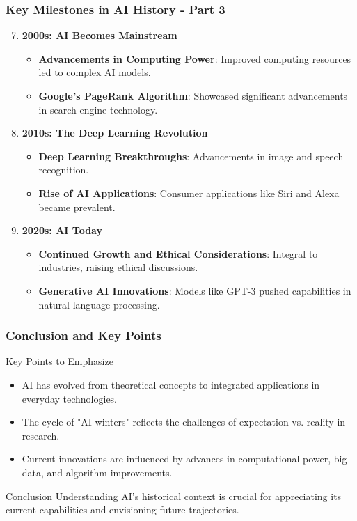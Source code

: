 \documentclass[aspectratio=169]{beamer}
\begin{document}
\begin{frame}[fragile]
    \frametitle{Key Milestones in AI History - Part 3}
    \begin{enumerate}
        \setcounter{enumi}{6} %
        \item \textbf{2000s: AI Becomes Mainstream}
            \begin{itemize}
                \item \textbf{Advancements in Computing Power}: Improved computing resources led to complex AI models.
                \item \textbf{Google’s PageRank Algorithm}: Showcased significant advancements in search engine technology.
            \end{itemize}
        \item \textbf{2010s: The Deep Learning Revolution}
            \begin{itemize}
                \item \textbf{Deep Learning Breakthroughs}: Advancements in image and speech recognition.
                \item \textbf{Rise of AI Applications}: Consumer applications like Siri and Alexa became prevalent.
            \end{itemize}
        \item \textbf{2020s: AI Today}
            \begin{itemize}
                \item \textbf{Continued Growth and Ethical Considerations}: Integral to industries, raising ethical discussions.
                \item \textbf{Generative AI Innovations}: Models like GPT-3 pushed capabilities in natural language processing.
            \end{itemize}
    \end{enumerate}
\end{frame}

\begin{frame}[fragile]
    \frametitle{Conclusion and Key Points}
    \begin{block}{Key Points to Emphasize}
        \begin{itemize}
            \item AI has evolved from theoretical concepts to integrated applications in everyday technologies.
            \item The cycle of "AI winters" reflects the challenges of expectation vs. reality in research.
            \item Current innovations are influenced by advances in computational power, big data, and algorithm improvements.
        \end{itemize}
    \end{block}
    \begin{block}{Conclusion}
        Understanding AI’s historical context is crucial for appreciating its current capabilities and envisioning future trajectories.
    \end{block}
\end{frame}
\end{document}
